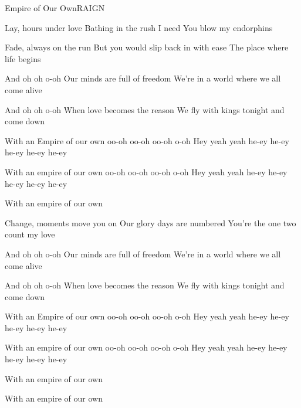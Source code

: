 \begin{Song}{Empire of Our Own}{RAIGN}
\begin{multicols}{2}

\begin{Verse}
Lay, hours under love
Bathing in the rush I need
You blow my endorphins
\espaceInterStrophe

Fade, always on the run
But you would slip back in with ease
The place where life begins
\end{Verse}
\espaceInterStrophe

\begin{PreChorus}
And oh oh o-oh
Our minds are full of freedom
We're in a world where we all come alive
\espaceInterStrophe

And oh oh o-oh
When love becomes the reason
We fly with kings tonight and come down
\end{PreChorus}
\espaceInterStrophe

\begin{Chorus}
With an Empire of our own
oo-oh oo-oh oo-oh o-oh
Hey yeah yeah
he-ey he-ey he-ey he-ey he-ey
\espaceInterStrophe

With an empire of our own
oo-oh oo-oh oo-oh o-oh
Hey yeah yeah
he-ey he-ey he-ey he-ey he-ey
\espaceInterStrophe

With an empire of our own
\end{Chorus}
\columnbreak

\begin{Verse}
Change, moments move you on
Our glory days are numbered
You're the one two count my love
\end{Verse}
\espaceInterStrophe

\begin{PreChorus}
And oh oh o-oh
Our minds are full of freedom
We're in a world where we all come alive
\espaceInterStrophe

And oh oh o-oh
When love becomes the reason
We fly with kings tonight and come down
\end{PreChorus}
\espaceInterStrophe

\begin{Chorus}
With an Empire of our own
oo-oh oo-oh oo-oh o-oh
Hey yeah yeah
he-ey he-ey he-ey he-ey he-ey
\espaceInterStrophe

With an empire of our own
oo-oh oo-oh oo-oh o-oh
Hey yeah yeah
he-ey he-ey he-ey he-ey he-ey
\espaceInterStrophe

With an empire of our own
\espaceInterStrophe

With an empire of our own
\end{Chorus}
\vfill
~



\end{multicols}
\end{Song}
